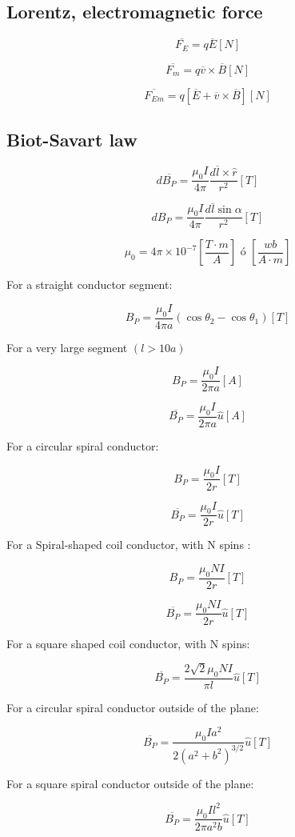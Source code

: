 \documentclass[letterpaper]{article}
\newcommand{\divline}{\noindent\makebox[\linewidth]{\rule{\textwidth}{0.4pt}}}
\begin{document}
    \begin{multicols}{2}
        \section{Lorentz, electromagnetic force}

        \[\overline{F_E} = q \overline{E} [N]\]

        \[\overline{F_m} = q \overline{v} \times \overline{B} [N]\]

        \[\overline{F_{Em}} = q [\overline{E} + \overline{v} \times \overline{B}] [N]\]
        
    \end{multicols}
    \divline

    \begin{multicols}{3}
        \section{Biot-Savart law }

        \[d \overline{B_P} = \frac{\mu_0 I}{4 \pi} \frac{d \overline{l} \times \hat{r}}{r^2} [T]\]
        
        \[d B_P = \frac{\mu_0 I}{4 \pi} \frac{d \overline{l} \sin{\alpha}}{r^2} [T]\]
        
        \[\mu_0 = 4 \pi \times 10^{-7} \left[ \frac{T \cdot m}{A} \right] \text{ ó } \left[ \frac{wb}{A \cdot m} \right]\]

        For a straight conductor segment:
        
        \[B_P = \frac{\mu_0 I}{4 \pi a} (\cos{\theta_2} - \cos{\theta_1} ) [T]\]

        For a very large segment \((l > 10 a)\)

        \[B_P = \frac{\mu_0 I}{2 \pi a} [A]\]

        \[\overline{B_P} = \frac{\mu_0 I}{2 \pi a} \hat{u} [A]\]

        For a circular spiral conductor:

        \[B_P = \frac{\mu_0 I}{2 r} [T]\]

        \[\overline{B_P} = \frac{\mu_0 I}{2 r} \hat{u} [T]\]

        For a Spiral-shaped coil conductor, with N spins :

        \[B_P = \frac{\mu_0 N I}{2 r} [T]\]
        
        \[\overline{B_P} = \frac{\mu_0 N I}{2 r} \hat{u} [T]\]

        For a square shaped coil conductor, with N spins:

        \[\overline{B_P} = \frac{2 \sqrt{2} \mu_0 N I}{\pi l} \hat{u} [T]\]

        For a circular spiral conductor outside of the plane:

        \[\overline{B_P} = \frac{\mu_0 I a^2}{2{(a^2 + b^2)}^{3/2}} \hat{u} [T]\]
        
        For a square spiral conductor outside of the plane:
        
        \[\overline{B_P} = \frac{\mu_0 I l^2}{2 \pi a^2 b } \hat{u} [T]\]
    \end{multicols}
    \divline
    
\end{document}
